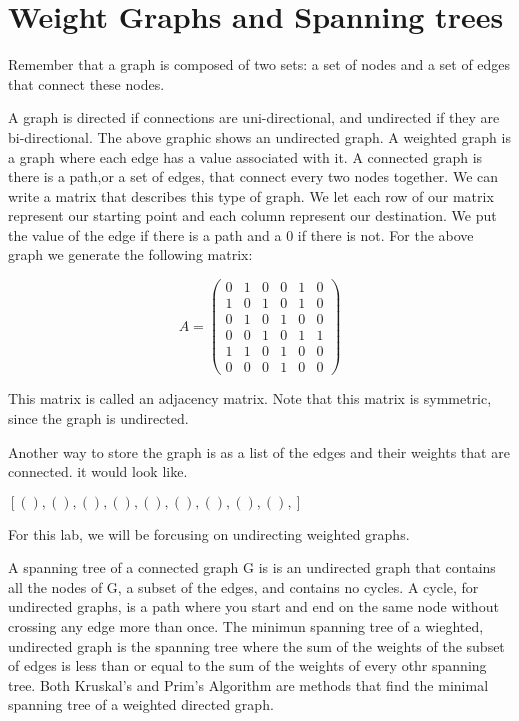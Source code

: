 \label{Ch:Kruskal}


\section*{Weight Graphs and Spanning trees}


Remember that a graph is composed of two sets: a set of nodes and a set of edges that connect these nodes. 

A graph is directed if connections are uni-directional, and undirected if they are bi-directional. The above graphic shows an undirected graph. A weighted graph is a graph where each edge has a value associated with it. A connected graph is there is a path,or a set of edges, that connect every two nodes together. We can write a matrix that describes this type of graph. We let each row of our matrix represent our starting point and each column represent our destination. We put the value of the edge if there is a path and a 0 if there is not. For the above graph we generate the following matrix:

\[
A = \begin{pmatrix}
0 & 1 & 0 & 0 & 1 & 0\\
1 & 0 & 1 & 0 & 1 & 0\\
0 & 1 & 0 & 1 & 0 & 0\\
0 & 0 & 1 & 0 & 1 & 1\\
1 & 1 & 0 & 1 & 0 & 0\\
0 & 0 & 0 & 1 & 0 & 0
\end{pmatrix}
\]

This matrix is called an adjacency matrix. Note that this matrix is symmetric, since the graph is undirected. 

Another way to store the graph is as a list of the edges and their weights that are connected. it would look like.

$[(   ),
 (   ),
 (   ),
 (   ),
 (   ),
 (   ),
 (   ),
 (   ),
 (   ),]$

For this lab, we will be forcusing on undirecting weighted graphs. 

A spanning tree of a connected graph G is is an undirected graph that contains all the nodes of G, a subset of the edges, and contains no cycles. A cycle, for undirected graphs, is a path where you start and end on the same node without crossing any edge more than once. The minimun spanning tree of a wieghted, undirected graph is the spanning tree where the sum of the weights of the subset of edges is less than or equal to the sum of the weights of every othr spanning tree. Both Kruskal's and Prim's Algorithm are methods that find the minimal spanning tree of a weighted directed graph.

